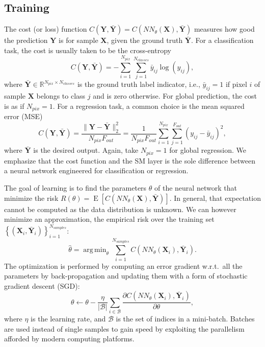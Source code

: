 \documentclass[final,twocolumn,3p,times,sort&compress]{elsarticle}
\renewcommand{\b}[1]{{\bm{#1}}}   %
\newcommand{\1}{\b{1}}              %
\newcommand{\0}{\b{0}}              %
\newcommand{\B}{\mathcal{B}}
\newcommand{\X}{\b{X}}
\newcommand{\Y}{\b{Y}}
\newcommand{\R}{\mathbb{R}}
\DeclareMathOperator*{\esp}{E}
\DeclareMathOperator*{\argmin}{arg \, min}
\begin{document}
\subsection{Training}

The cost (or loss) function $C(\Y, \bar \Y) = C(NN_\theta(\X), \bar \Y)$ measures how good the prediction $\Y$ is for sample $\X$, given the ground truth $\bar \Y$. For a classification task, the cost is usually taken to be the cross-entropy
\begin{equation*}
	C(\Y, \bar \Y) = - \sum_{i=1}^{N_{pix}} \sum_{j=1}^{N_{classes}} \bar y_{ij} \log(y_{ij}),
\end{equation*}
where $\bar \Y \in \R^{N_{pix} \times N_{classes}}$ is the ground truth label indicator, i.e., $\bar y_{ij} = 1$ if pixel $i$ of sample $\X$ belongs to class $j$ and is zero otherwise. For global prediction, the cost is as if $N_{pix} = 1$.
For a regression task, a common choice is the mean squared error (MSE)
\begin{equation*}
	C(\Y, \bar \Y) = \frac{\|\Y-\bar{\Y}\|_2^2}{N_{pix} F_{out}} = \frac{1}{N_{pix} F_{out}} \sum_{i=1}^{N_{pix}} \sum_{j=1}^{F_{out}} (y_{ij} - \bar y_{ij})^2,
\end{equation*}
where $\bar{\Y}$ is the desired output. Again, take $N_{pix} = 1$ for global regression. We emphasize that the cost function and the SM layer is the sole difference between a neural network engineered for classification or regression.

The goal of learning is to find the parameters $\theta$ of the neural network that minimize the risk $R(\theta) = \esp \left[ C \left( NN_\theta(\X), \bar \Y \right) \right]$. In general, that expectation cannot be computed as the data distribution is unknown. We can however minimize an approximation, the empirical risk over the training set $\left\{ \left( \X_i, \bar \Y_i \right) \right\}_{i=1}^{N_{samples}}$:
\begin{equation*}
	\hat{\theta} = \argmin_\theta \sum_{i=1}^{N_{samples}} C \left(NN_\theta(\X_i), \bar \Y_i \right).
\end{equation*}
The optimization is performed by computing an error gradient w.r.t.\ all the parameters by back-propagation and updating them with a form of stochastic gradient descent (SGD):
\begin{equation*}
	\theta \leftarrow \theta - \frac{\eta}{|\B|} \sum_{i \in \B} \frac{\partial C \left( NN_\theta(\X_i), \bar \Y_i \right)}{\partial \theta} ,
\end{equation*}
where $\eta$ is the learning rate, and $\B$ is the set of indices in a mini-batch. Batches are used instead of single samples to gain speed by exploiting the parallelism afforded by modern computing platforms.
\end{document}
